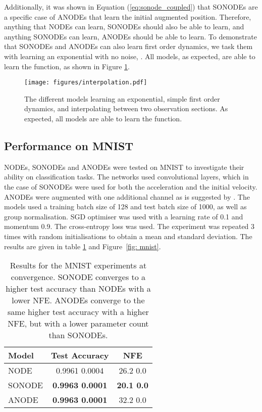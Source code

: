 \documentclass{article}
\theoremstyle{remark}
\theoremstyle{definition}
\begin{document}
Additionally, it was shown in Equation (\ref{eq:sonode_coupled}) that SONODEs are a specific case of ANODEs that learn the initial augmented position. Therefore, anything that NODEs can learn, SONODEs should also be able to learn, and anything SONODEs can learn, ANODEs should be able to learn. To demonstrate that SONODEs and ANODEs can also learn first order dynamics, we task them with learning an exponential with no noise, . All models, as expected, are able to learn the function, as shown in Figure \ref{fig: interp}.

\begin{figure}[h]
    \centering
    \texttt{[image: figures/interpolation.pdf]}
    \caption{The different models learning an exponential, simple first order dynamics, and interpolating between two observation sections. As expected, all models are able to learn the function.}
    \label{fig: interp}
\end{figure}


\subsection{Performance on MNIST}

\label{app: mnist}
NODEs, SONODEs and ANODEs were tested on MNIST \cite{lecun1998gradient} to investigate their ability on classification tasks. The networks used convolutional layers, which in the case of SONODEs were used for both the acceleration and the initial velocity. ANODEs were augmented with one additional channel as is suggested by \citet{dupont2019augmented}. The models used a training batch size of 128 and test batch size of 1000, as well as group normalisation. SGD optimiser was used with a learning rate of 0.1 and momentum 0.9. The cross-entropy loss was used. The experiment was repeated 3 times with random initialisations to obtain a mean and standard deviation. The results are given in table \ref{tab: mnist} and Figure~\ref{fig: mnist}.

\begin{table}[h!]
    \centering
    \caption{Results for the MNIST experiments at convergence. SONODE converges to a higher test accuracy than NODEs with a lower NFE. ANODEs converge to the same higher test accuracy with a higher NFE, but with a lower parameter count than SONODEs.}
    \label{tab: mnist}
    \begin{tabular}{l cc}
    \toprule
        Model &  Test Accuracy & NFE\\
    \midrule
    NODE  & 0.9961  0.0004 & 26.2  0.0\\
    SONODE  &  \textbf{0.9963  0.0001} & \textbf{20.1  0.0}\\
    ANODE & \textbf{0.9963  0.0001} & 32.2  0.0 \\ 
    \bottomrule
    \end{tabular}
\end{table}
\end{document}
